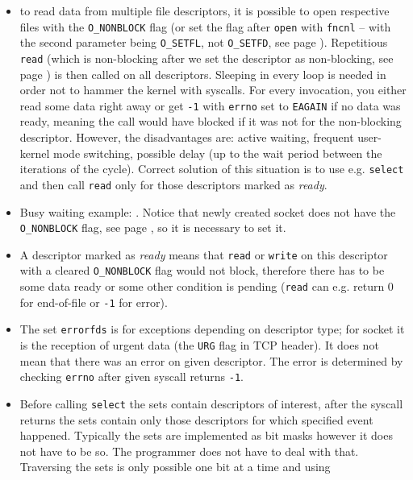 \begin{itemize}
\item {} to read data from multiple file descriptors, it is
possible to open respective files with the \texttt{O\_NONBLOCK} flag
(or set the flag after \texttt{open} with \texttt{fncnl} -- with the second
parameter being \texttt{O\_SETFL}, not \texttt{O\_SETFD}, see page
\pageref{FCNTL}).  Repetitious \texttt{read} (which is non-blocking after we set
the descriptor as non-blocking, see page \pageref{OPEN}) is then called on all
descriptors.  Sleeping in every loop is needed in order not to hammer the kernel
with syscalls.  For every invocation, you either read some data right away or get
\texttt{-1} with \texttt{errno} set to \texttt{EAGAIN} if no data was ready,
meaning the call would have blocked if it was not for the non-blocking
descriptor.  However, the disadvantages are: active waiting, frequent
user-kernel mode switching, possible delay (up to the wait period between the
iterations of the cycle).  Correct solution of this situation is to use e.g.
\texttt{select} and then call \texttt{read} only for those descriptors marked as
\emph{ready}.
\item \label{BUSY_WAITING_C} Busy waiting example: .
Notice that newly created socket does not have the \texttt{O\_NONBLOCK} flag,
see page \pageref{ACCEPT}, so it is necessary to set it.
\item A descriptor marked as \emph{ready} means that \texttt{read} or
\texttt{write} on this descriptor with a cleared \texttt{O\_NONBLOCK} flag would
not block, therefore there has to be some data ready or some other condition is
pending (\texttt{read} can e.g. return 0 for end-of-file or \texttt{-1} for
error).
\item The set \texttt{errorfds} is for exceptions depending on descriptor type;
for socket it is the reception of urgent data (the \texttt{URG} flag in TCP
header). It does not mean that there was an error on given descriptor.  The
error is determined by checking \texttt{errno} after given syscall returns
\texttt{-1}.
\item Before calling \texttt{select} the sets contain descriptors of interest,
after the syscall returns the sets contain only those descriptors for which 
specified event happened.   Typically the sets are implemented as bit
masks however it does not have to be so. The programmer does not have to deal
with that. Traversing the sets is only possible one bit at a time and using

\end{itemize}
